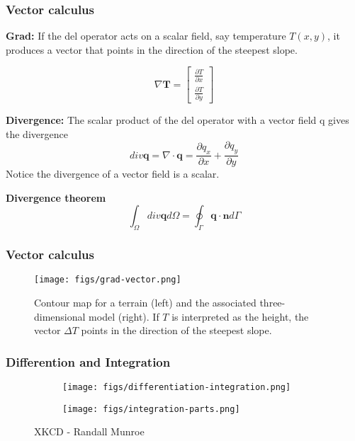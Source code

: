 \documentclass[notes]{beamer}
\begin{document}
\begin{frame}
\frametitle{Vector calculus}


\textbf{Grad:} If the del operator acts on a scalar field, say temperature $T(x, y)$, it produces a vector
that points in the direction of the steepest slope.

\begin{equation*}
	\nabla \mathbf{T} =  
	\begin{bmatrix} 
		\frac{\partial T}{\partial x} \\
		\frac{\partial T}{\partial y}
	\end{bmatrix}
\end{equation*}

\textbf{Divergence:} The scalar product of the del operator with a vector field q gives the divergence
\begin{equation*}
	div \mathbf{q} = \nabla \cdot \mathbf{q} = \frac{\partial q_x}{\partial x} + \frac{\partial q_y}{\partial y}
\end{equation*}
Notice the divergence of a vector field is a scalar.

\textbf{Divergence theorem}
\begin{equation*}
	\int_\Omega div \mathbf{q} d\Omega = \oint_\Gamma \mathbf{q}\cdot \mathbf{n} d\Gamma
\end{equation*}
\end{frame}


\begin{frame}
\frametitle{Vector calculus}
\begin{figure}
	\centering
	\texttt{[image: figs/grad-vector.png]}
	\caption*{Contour map for a terrain (left) and the associated three-dimensional model (right). If $T$
	is interpreted as the height, the vector $\Delta T$ points in the direction of the steepest slope.}
\end{figure}
\end{frame}

\begin{frame}
\frametitle{Differention and Integration}
\begin{figure}[ht]
	\centering
	\begin{subfigure}[b]{0.49\linewidth}
		\centering
		\texttt{[image: figs/differentiation-integration.png]}
	\end{subfigure}	
	\begin{subfigure}[b]{0.49\linewidth}
		\centering
		\texttt{[image: figs/integration-parts.png]}
	\end{subfigure}%
	\caption*{XKCD - Randall Munroe}
\end{figure}
\end{frame}
\end{document}
